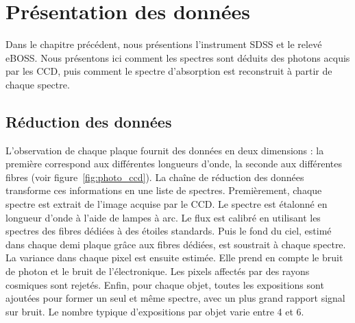 \documentclass[11pt, twoside, a4paper, openright]{report}
\begin{document}

\graphicspath{ {../figures/donnees/} }

\chapter{Présentation des données}
\minitoc
\newpage
\thispagestyle{fancy}

Dans le chapitre précédent, nous présentions l'instrument SDSS et le relevé eBOSS.
Nous présentons ici comment les spectres sont déduits des photons acquis par les CCD, puis comment le spectre d'absorption est reconstruit à partir de chaque spectre.

\section{Réduction des données}
L'observation de chaque plaque fournit des données en deux dimensions : la première correspond aux différentes longueurs d'onde, la seconde aux différentes fibres (voir figure~\ref{fig:photo_ccd}). La chaîne de réduction des données transforme ces informations en une liste de spectres.
Premièrement, chaque spectre est extrait de l'image acquise par le CCD. Le spectre est étalonné en longueur d'onde à l'aide de lampes à arc. Le flux est calibré en utilisant les spectres des fibres dédiées à des étoiles standards.
Puis le fond du ciel, estimé dans chaque demi plaque grâce aux fibres dédiées, est soustrait à chaque spectre.
La variance dans chaque pixel est ensuite estimée. Elle prend en compte le bruit de photon et le bruit de l'électronique. Les pixels affectés par des rayons cosmiques sont rejetés.
Enfin, pour chaque objet, toutes les expositions sont ajoutées pour former un seul et même spectre, avec un plus grand rapport signal sur bruit. Le nombre typique d'expositions par objet varie entre 4 et 6.
\end{document}

